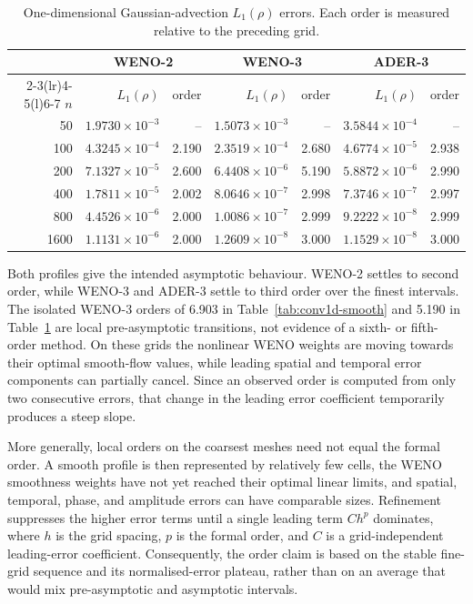 \begin{table}[H]
\centering
\small
\setlength{\tabcolsep}{4.2pt}
\renewcommand{\arraystretch}{1.13}
\begin{tabular}{@{}r rr rr rr@{}}
\toprule
& \multicolumn{2}{c}{WENO-2} & \multicolumn{2}{c}{WENO-3}
& \multicolumn{2}{c}{ADER-3} \\
\cmidrule(lr){2-3}\cmidrule(lr){4-5}\cmidrule(l){6-7}
\(n\) & \(L_1(\rho)\) & order & \(L_1(\rho)\) & order
& \(L_1(\rho)\) & order \\
\midrule
50  & \(1.9730\times10^{-3}\) & --    & \(1.5073\times10^{-3}\) & --
    & \(3.5844\times10^{-4}\) & -- \\
100 & \(4.3245\times10^{-4}\) & 2.190 & \(2.3519\times10^{-4}\) & 2.680
    & \(4.6774\times10^{-5}\) & 2.938 \\
200 & \(7.1327\times10^{-5}\) & 2.600 & \(6.4408\times10^{-6}\) & 5.190
    & \(5.8872\times10^{-6}\) & 2.990 \\
400 & \(1.7811\times10^{-5}\) & 2.002 & \(8.0646\times10^{-7}\) & 2.998
    & \(7.3746\times10^{-7}\) & 2.997 \\
800 & \(4.4526\times10^{-6}\) & 2.000 & \(1.0086\times10^{-7}\) & 2.999
    & \(9.2222\times10^{-8}\) & 2.999 \\
1600 & \(1.1131\times10^{-6}\) & 2.000 & \(1.2609\times10^{-8}\) & 3.000
     & \(1.1529\times10^{-8}\) & 3.000 \\
\bottomrule
\end{tabular}
\caption{One-dimensional Gaussian-advection \(L_1(\rho)\) errors. Each order
is measured relative to the preceding grid.}
\label{tab:conv1d-gaussian}
\end{table}

Both profiles give the intended asymptotic behaviour. WENO-2 settles to
second order, while WENO-3 and ADER-3 settle to third order over the finest
intervals. The isolated WENO-3 orders of 6.903 in
Table~\ref{tab:conv1d-smooth} and 5.190 in
Table~\ref{tab:conv1d-gaussian} are local pre-asymptotic transitions, not
evidence of a sixth- or fifth-order method. On these grids the nonlinear WENO
weights are moving towards their optimal smooth-flow values, while leading
spatial and temporal error components can partially cancel. Since an
observed order is computed from only two consecutive errors, that change in
the leading error coefficient temporarily produces a steep slope.

More generally, local orders on the coarsest meshes need not equal the formal
order. A smooth profile is then represented by relatively few cells, the WENO
smoothness weights have not yet reached their optimal linear limits, and
spatial, temporal, phase, and amplitude errors can have comparable sizes.
Refinement suppresses the higher error terms until a single leading term
\(C h^p\) dominates, where \(h\) is the grid spacing, \(p\) is the formal
order, and \(C\) is a grid-independent leading-error coefficient.
Consequently, the order claim is based on the stable
fine-grid sequence and its normalised-error plateau, rather than on an average
that would mix pre-asymptotic and asymptotic intervals.

